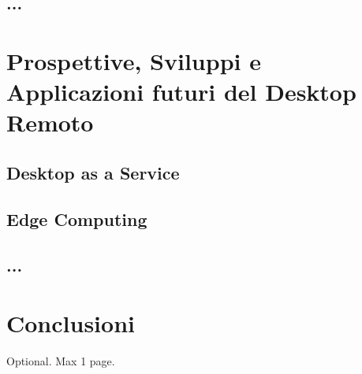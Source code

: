 \documentclass[12pt,a4paper,openright,twoside]{book}
\begin{document}
\section{...}

\chapter{Prospettive, Sviluppi e Applicazioni futuri del Desktop Remoto}

\section{Desktop as a Service}

\section{Edge Computing}

\section{...}

\chapter{Conclusioni}
\label{chap:conclusions}


\backmatter

\nocite{*} %




\begin{acknowledgements} %
Optional. Max 1 page.
\end{acknowledgements}
\end{document}
